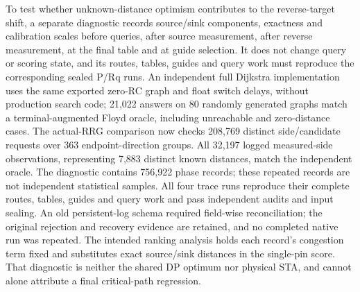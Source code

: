 \documentclass[conference,10pt]{IEEEtran}
\begin{document}
To test whether unknown-distance optimism contributes to the reverse-target shift, a separate diagnostic records source/sink components, exactness and calibration scales before queries, after source measurement, after reverse measurement, at the final table and at guide selection. It does not change query or scoring state, and its routes, tables, guides and query work must reproduce the corresponding sealed P/Rq runs. An independent full Dijkstra implementation uses the same exported zero-RC graph and float switch delays, without production search code; 21,022 answers on 80 randomly generated graphs match a terminal-augmented Floyd oracle, including unreachable and zero-distance cases. The actual-RRG comparison now checks 208,769 distinct side/candidate requests over 363 endpoint-direction groups. All 32,197 logged measured-side observations, representing 7,883 distinct known distances, match the independent oracle. The diagnostic contains 756,922 phase records; these repeated records are not independent statistical samples. All four trace runs reproduce their complete routes, tables, guides and query work and pass independent audits and input sealing. An old persistent-log schema required field-wise reconciliation; the original rejection and recovery evidence are retained, and no completed native run was repeated. The intended ranking analysis holds each record's congestion term fixed and substitutes exact source/sink distances in the single-pin score. That diagnostic is neither the shared DP optimum nor physical STA, and cannot alone attribute a final critical-path regression.
\end{document}
